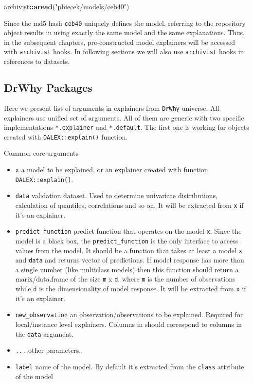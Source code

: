 \documentclass[12pt,]{krantz}
\newenvironment{Shaded}{\begin{snugshade}}{\end{snugshade}}
\newcommand{\KeywordTok}[1]{\textcolor[rgb]{0.13,0.29,0.53}{\textbf{#1}}}
\newcommand{\NormalTok}[1]{#1}
\newcommand{\OperatorTok}[1]{\textcolor[rgb]{0.81,0.36,0.00}{\textbf{#1}}}
\newcommand{\StringTok}[1]{\textcolor[rgb]{0.31,0.60,0.02}{#1}}
\providecommand{\tightlist}{%
  \setlength{\itemsep}{0pt}\setlength{\parskip}{0pt}}
\begin{document}
\begin{Shaded}
\begin{Highlighting}[]
\NormalTok{archivist}\OperatorTok{::}\KeywordTok{aread}\NormalTok{(}\StringTok{"pbiecek/models/ceb40"}\NormalTok{)}
\end{Highlighting}
\end{Shaded}

Since the md5 hash \texttt{ceb40} uniquely defines the model, referring to the repository object results in using exactly the same model and the same explanations. Thus, in the subsequent chapters, pre-constructed model explainers will be accessed with \texttt{archivist} hooks. In following sections we will also use \texttt{archivist} hooks in references to datasets.

\hypertarget{Packages}{%
\subsection{DrWhy Packages}\label{Packages}}

Here we present list of arguments in explainers from \texttt{DrWhy} universe.
All explainers use unified set of arguments. All of them are generic with two specific implementations \texttt{*.explainer} and \texttt{*.default}. The first one is working for objects created with \texttt{DALEX::explain()} function.

Common core arguments

\begin{itemize}
\tightlist
\item
  \texttt{x} a model to be explained, or an explainer created with function \texttt{DALEX::explain()}.
\item
  \texttt{data} validation dataset. Used to determine univariate distributions, calculation of quantiles, correlations and so on. It will be extracted from \texttt{x} if it's an explainer.
\item
  \texttt{predict\_function} predict function that operates on the model \texttt{x}. Since the model is a black box, the \texttt{predict\_function} is the only interface to access values from the model. It should be a function that takes at least a model \texttt{x} and \texttt{data} and returns vector of predictions. If model response has more than a single number (like multiclass models) then this function should return a marix/data.frame of the size \texttt{m} x \texttt{d}, where \texttt{m} is the number of observations while \texttt{d} is the dimensionality of model response. It will be extracted from \texttt{x} if it's an explainer.
\item
  \texttt{new\_observation} an observation/observations to be explained. Required for local/instance level explainers. Columns in should correspond to columns in the \texttt{data} argument.
\item
  \texttt{...} other parameters.
\item
  \texttt{label} name of the model. By default it's extracted from the \texttt{class} attribute of the model
\end{itemize}
\end{document}
